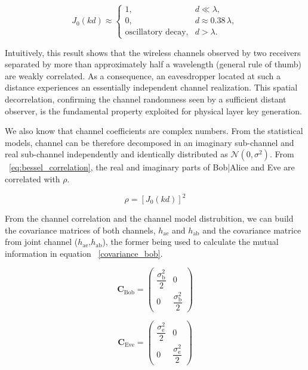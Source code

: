 \begin{equation}
J_0(k d) \approx
\begin{cases}
1, & d \ll \lambda, \\[6pt]
0, & d \approx 0.38\,\lambda, \\[6pt]
\text{oscillatory decay}, & d > \lambda .
\end{cases}
\label{eq:bessel_fading}
\end{equation}

Intuitively, this result shows that the wireless channels observed by two receivers separated by more than approximately half a wavelength (general rule of thumb) are weakly correlated. As a consequence, an eavesdropper located at such a distance experiences an essentially independent channel realization.  This spatial decorrelation, confirming the channel randomness seen by a sufficient distant observer, is the fundamental property exploited for physical layer key generation.

We also know that channel coefficients are complex numbers.  From the statistical models, channel can be therefore decomposed in an imaginary sub-channel and real sub-channel independently and identically distributed as $\mathcal{N} (0,\sigma^2)$.  From  ~\ref{eq:bessel_correlation}, the real and imaginary parts of Bob|Alice and Eve are correlated with $\rho$.

\begin{equation}
\rho = [ J_0(k d)] ^2
\label{eq:bessel_correlation}
\end{equation}

From the channel correlation and the channel model distrubition, we can build the covariance matrices of both channels, $h_{\mathrm{ae}}$ and $h_{\mathrm{ab}}$ and the covariance matrice from joint channel ($h_{\mathrm{ae}}$,$h_{\mathrm{ab}}$), the former being used to calculate the mutual information in equation ~\ref{covariance_bob}.

\begin{equation}
\mathbf{C}_{\text{Bob}} =
    \begin{pmatrix}
    \dfrac{\sigma^2_{\text{b}}}{2} & 0\\[6pt]
    0 & \dfrac{\sigma^2_{\text{b}}}{2}
    \end{pmatrix}
\label{covariance_bob}
\end{equation}

\begin{equation}
\mathbf{C}_{\text{Eve}} =
    \begin{pmatrix}
    \dfrac{\sigma^2_{\text{e}}}{2} & 0\\[6pt]
    0 & \dfrac{\sigma^2_{\text{e}}}{2}
    \end{pmatrix}
\label{covariance_eve}
\end{equation}

